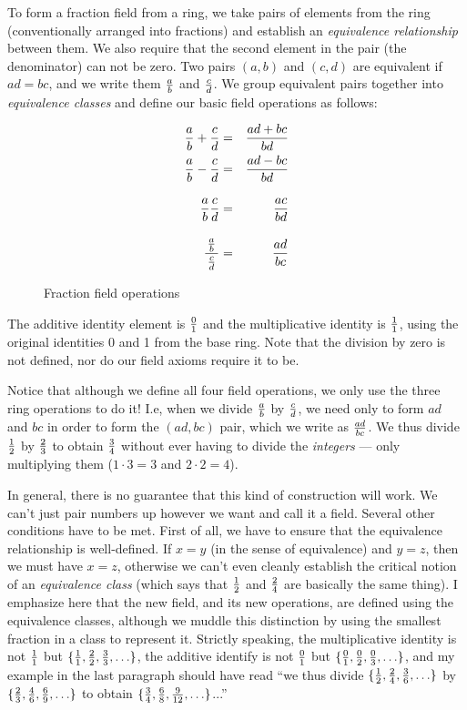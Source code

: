 To form a fraction field from a ring, we take pairs of elements from
the ring (conventionally arranged into fractions) and establish an
{\it equivalence relationship} between them.  We also require that the
second element in the pair (the denominator) can not be zero.  Two
pairs $(a,b)$ and $(c,d)$ are equivalent if $ad=bc$, and we write them
$a\over b$ and $c\over d$.  We group equivalent pairs together into
{\it equivalence classes} and define our basic field operations as
follows:

\begin{figure}[h]
\label{fraction field operations}
\begin{mdframed}[backgroundcolor=cyan!20]
\begin{center}
\begin{eqnarray*}
{a\over b} + {c\over d} &=& {{ad+bc}\over{bd}} \cr
{a\over b} - {c\over d} &=& {{ad-bc}\over{bd}} \cr
{a\over b} {c\over d} &=& {{ac}\over{bd}} \vbox to20pt{}\cr
{\,{a\over b}\, \over {c \over d}} &=& {{ad}\over{bc}} \vbox to24pt{}\cr
\end{eqnarray*}
\end{center}
\end{mdframed}
\caption{Fraction field operations}
\end{figure}

The additive identity element is $0\over1$ and the multiplicative
identity is $1\over1$, using the original identities 0 and 1 from the
base ring.  Note that the division by zero is not defined, nor do
our field axioms require it to be.

Notice that although we define all four field operations, we only
use the three ring operations to do it!  I.e, when we divide
$a\over b$ by $c\over d$, we need only to form $ad$ and $bc$
in order to form the $(ad,bc)$ pair, which we write as ${ad}\over{bc}$.
We thus divide $1\over2$ by $2\over3$ to obtain $3\over4$
without ever having to divide the {\it integers} ---
only multiplying them ($1\cdot3=3$ and $2\cdot2=4$).

In general, there is no guarantee that this kind of construction will
work.  We can't just pair numbers up however we want and call it a
field.  Several other conditions have to be met.  First of all, we
have to ensure that the equivalence relationship is well-defined.  If
$x=y$ (in the sense of equivalence) and $y=z$, then we must have
$x=z$, otherwise we can't even cleanly establish the critical notion
of an {\it equivalence class} (which says that $1\over2$ and $2\over4$
are basically the same thing).  I emphasize here that the new field,
and its new operations, are defined using the equivalence classes,
although we muddle this distinction by using the smallest fraction in
a class to represent it.  Strictly speaking, the multiplicative
identity is not ${1\over1}$ but
$\{{1\over1},{2\over2},{3\over3},\ldots\}$, the additive identify is
not ${0\over1}$ but $\{{0\over1},{0\over2},{0\over3},\ldots\}$, and my
example in the last paragraph should have read ``we thus divide
$\{{1\over2},{2\over4},{3\over6},\ldots\}$ by
$\{{2\over3},{4\over6},{6\over9},\ldots\}$ to obtain
$\{{3\over4},{6\over8},{9\over12},\ldots\}$...''

